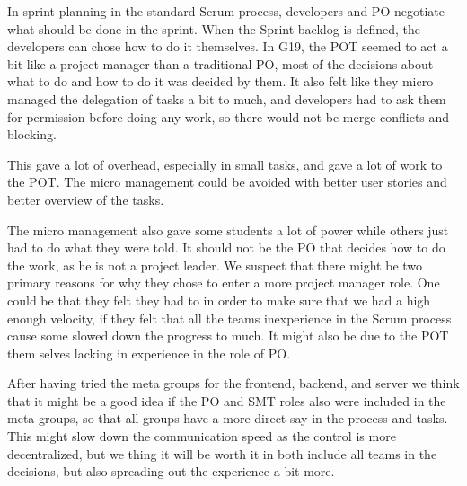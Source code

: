 In sprint planning in the standard Scrum process, developers and PO negotiate what should be done in the sprint. When the Sprint backlog is defined, the developers can chose how to do it themselves. In \gls{G19}, the \Gls{POT} seemed to act a bit like a project manager than a traditional \gls{PO}, most of the decisions about what to do and how to do it was decided by them. It also felt like they micro managed the delegation of tasks a bit to much, and developers had to ask them for permission before doing any work, so there would not be merge conflicts and blocking.

This gave a lot of overhead, especially in small tasks, and gave a lot of work to the \gls{POT}. The micro management could be avoided with better user stories and better overview of the tasks.

The micro management also gave some students a lot of power while others just had to do what they were told. It should not be the PO that decides how to do the work, as he is not a project leader.
We suspect that there might be two primary reasons for why they chose to enter a more project manager role. One could be that they felt they had to in order to make sure that we had a high enough velocity, if they felt that all the teams inexperience in the Scrum process cause some slowed down the progress to much. It might also be due to the \gls{POT} them selves lacking in experience in the role of \gls{PO}.

After having tried the meta groups for the frontend, backend, and server we think that it might be a good idea if the \gls{PO} and \gls{SMT} roles also were included in the meta groups, so that all groups have a more direct say in the process and tasks. This might slow down the communication speed as the control is more decentralized, but we thing it will be worth it in both include all teams in the decisions, but also spreading out the experience a bit more. 